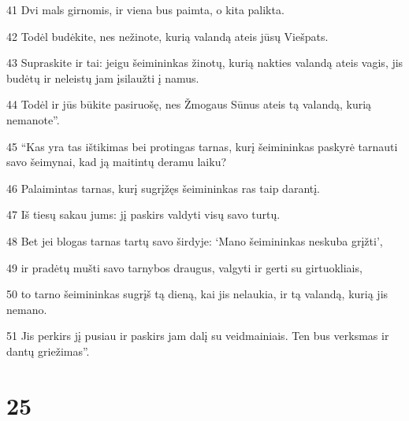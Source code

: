 \par 41 Dvi mals girnomis, ir viena bus paimta, o kita palikta. 
\par 42 Todėl budėkite, nes nežinote, kurią valandą ateis jūsų Viešpats. 
\par 43 Supraskite ir tai: jeigu šeimininkas žinotų, kurią nakties valandą ateis vagis, jis budėtų ir neleistų jam įsilaužti į namus. 
\par 44 Todėl ir jūs būkite pasiruošę, nes Žmogaus Sūnus ateis tą valandą, kurią nemanote”. 
\par 45 “Kas yra tas ištikimas bei protingas tarnas, kurį šeimininkas paskyrė tarnauti savo šeimynai, kad ją maitintų deramu laiku? 
\par 46 Palaimintas tarnas, kurį sugrįžęs šeimininkas ras taip darantį. 
\par 47 Iš tiesų sakau jums: jį paskirs valdyti visų savo turtų. 
\par 48 Bet jei blogas tarnas tartų savo širdyje: ‘Mano šeimininkas neskuba grįžti’, 
\par 49 ir pradėtų mušti savo tarnybos draugus, valgyti ir gerti su girtuokliais,­ 
\par 50 to tarno šeimininkas sugrįš tą dieną, kai jis nelaukia, ir tą valandą, kurią jis nemano. 
\par 51 Jis perkirs jį pusiau ir paskirs jam dalį su veidmainiais. Ten bus verksmas ir dantų griežimas”.



\chapter{25}


